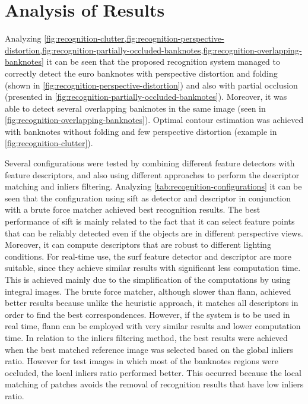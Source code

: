\section{Analysis of Results}\label{sec:results-analysis}

Analyzing \cref{fig:recognition-clutter,fig:recognition-perspective-distortion,fig:recognition-partially-occluded-banknotes,fig:recognition-overlapping-banknotes} it can be seen that the proposed recognition system managed to correctly detect the euro banknotes with perspective distortion and folding (shown in \cref{fig:recognition-perspective-distortion}) and also with partial occlusion (presented in \cref{fig:recognition-partially-occluded-banknotes}). Moreover, it was able to detect several overlapping banknotes in the same image (seen in \cref{fig:recognition-overlapping-banknotes}). Optimal contour estimation was achieved with banknotes without folding and few perspective distortion (example in \cref{fig:recognition-clutter}).

Several configurations were tested by combining different feature detectors with feature descriptors, and also using different approaches to perform the descriptor matching and inliers filtering. Analyzing \cref{tab:recognition-configurations} it can be seen that the configuration using \gls{sift} as detector and descriptor in conjunction with a brute force matcher achieved best recognition results. The best performance of \gls{sift} is mainly related to the fact that it can select feature points that can be reliably detected even if the objects are in different perspective views. Moreover, it can compute descriptors that are robust to different lighting conditions. For real-time use, the \gls{surf} feature detector and descriptor are more suitable, since they achieve similar results with significant less computation time. This is achieved mainly due to the simplification of the computations by using integral images. The brute force matcher, although slower than \gls{flann}, achieved better results because unlike the heuristic approach, it matches all descriptors in order to find the best correspondences. However, if the system is to be used in real time, \gls{flann} can be employed with very similar results and lower computation time. In relation to the inliers filtering method, the best results were achieved when the best matched reference image was selected based on the global inliers ratio. However for test images in which most of the banknotes regions were occluded, the local inliers ratio performed better. This occurred because the local matching of patches avoids the removal of recognition results that have low inliers ratio.
